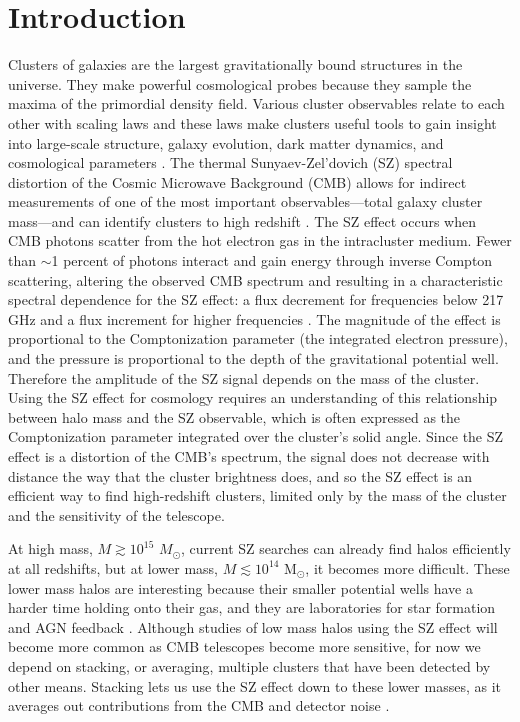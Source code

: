 \documentclass[a4paper,fleqn,usenatbib]{mnras}
\begin{document}



\section{Introduction}
Clusters of galaxies are the largest gravitationally bound structures in the universe. They make powerful cosmological probes because they sample the maxima of the primordial density field.  Various cluster observables relate to each other with scaling laws and these laws make clusters useful tools to gain insight into large-scale structure, galaxy evolution, dark matter dynamics, and cosmological parameters \citep{2005RvMP...77..207V,2013SSRv..177..247G}. The thermal Sunyaev-Zel'dovich (SZ) spectral distortion of the Cosmic Microwave Background (CMB) allows for indirect measurements of one of the most important observables---total galaxy cluster mass---and can identify clusters to high redshift \citep{1972CoASP...4..173S, 2002ARA&A..40..643C}. 
The SZ effect occurs when CMB photons scatter from the hot electron gas in the intracluster medium. Fewer than $\sim$1 percent of photons interact and gain energy through inverse Compton scattering, altering the observed CMB spectrum and resulting in a characteristic spectral dependence for the SZ effect: a flux decrement for frequencies below 217 GHz and a flux increment for higher frequencies \citep{1999PhR...310...97B,2002ARA&A..40..643C}.
The magnitude of the effect is proportional to the Comptonization parameter (the integrated electron pressure), and the pressure is proportional to the depth of the gravitational potential well.  Therefore the amplitude of the SZ signal depends on the mass of the cluster.
Using the SZ effect for cosmology requires an understanding of this relationship between halo mass and the SZ observable, which is often expressed as the Comptonization parameter integrated over the cluster's solid angle. 
Since the SZ effect is a distortion of the CMB's spectrum, the signal does not decrease with distance the way that the cluster brightness does, and so the SZ effect is an efficient way to find high-redshift clusters, limited only by the mass of the cluster and the sensitivity of the telescope.

At high mass, $M \gtrsim 10^{15}$ $M_\odot$, current SZ searches can already find halos efficiently at all redshifts, but at lower mass, $M \lesssim 10^{14}$ M$_{\odot}$, it becomes more difficult. These lower mass halos are interesting because their smaller potential wells have a harder time holding onto their gas, and they are laboratories for star formation and AGN feedback \citep{2015MNRAS.448.2085L,2013A&A...555A..66L}.  Although studies of low mass halos using the SZ effect will become more common as CMB telescopes become more sensitive, for now we depend on stacking, or averaging, multiple clusters that have been detected by other means.  Stacking lets us use the SZ effect down to these lower masses, as it averages out contributions from the CMB and detector noise \citep{2013ApJ...767...38S, 2011A&A...536A..12P, 2011ApJ...736...39H}.
\end{document}
